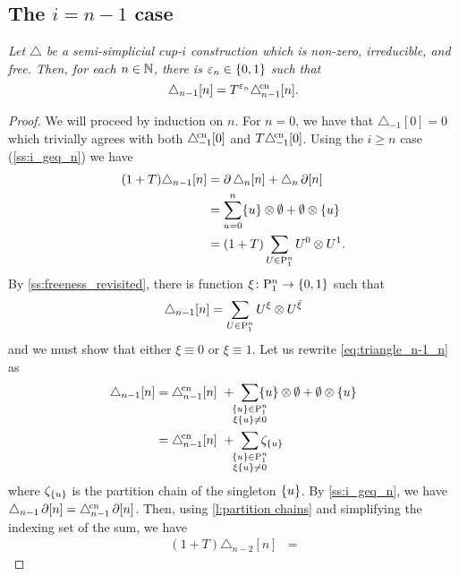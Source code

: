 \subsection{The $i = n-1$ case}\label{ss:i_equals_n_minus_1}

\textit{
	Let $\triangle$ be a semi-simplicial cup-$i$ construction which is non-zero, irreducible, and free.
	Then, for each $n \in \mathbb{N}$, there is $\varepsilon_n \in \{0,1\}$ such that
	\[
	\triangle_{n-1} [n] = T^{\varepsilon_n} \triangle^{\!\mathrm{cn}}_{n-1} [n].
	\]
}

\begin{proof}
	We will proceed by induction on $n$.
	For $n = 0$, we have that $\triangle_{-1}[0] = 0$ which trivially agrees with both $\triangle^{\!\mathrm{cn}}_{-1}[0]$ and $T\triangle^{\!\mathrm{cn}}_{-1}[0]$.
	Using the $i \geq n$ case (\cref{ss:i_geq_n}) we have
	\begin{align*}
		(1+T)\triangle_{n-1}[n] &=
		\operatorname{\partial}\triangle_n[n] + \triangle_n\operatorname{\partial}[n] \\ &=
		\sum_{u=0}^n \{u\} \otimes \emptyset + \emptyset \otimes \{u\} \\ &=
		(1+T)\sum_{U \in \mathrm{P}_1^n} U^0 \otimes U^1.
	\end{align*}
	By \cref{ss:freeness_revisited},  there is function $\xi \colon \mathrm{P}_1^n \to \{0,1\}$ such that
	\begin{equation}\label{eq:triangle_n-1_n}
		\triangle_{n-1}[n] = \sum_{U \in \mathrm{P}_1^n} U^\xi \otimes U^{\bar{\xi}}
	\end{equation}
	and we must show that either $\xi \equiv 0$ or $\xi \equiv 1$.
	Let us rewrite \cref{eq:triangle_n-1_n} as
	\begin{align*}
		\triangle_{n-1}[n] &=
		\canonical_{n-1}[n] \ + \ \sum_{\mathclap{\substack{\set{u} \in \P_1^n \\ \xi \set{u} \neq 0}}} \set{u} \ot \emptyset + \emptyset \ot \set{u} \\ &=
		\canonical_{n-1}[n] \ + \ \sum_{\mathclap{\substack{\set{u} \in \P_1^n \\ \xi \set{u} \neq 0}}} \zeta_{\set{u}}
	\end{align*}
	where $\zeta_{\{u\}}$ is the partition chain of the singleton $\{u\}$.
	By \cref{ss:i_geq_n}, we have $\triangle_{n-1}\operatorname{\partial}[n] = \triangle^{\!\mathrm{cn}}_{n-1}\operatorname{\partial}[n]$.
	Then, using \cref{l:partition chains} and simplifying the indexing set of the sum, we have
	\begin{align*}
		(1+T) \triangle_{n-2}[n] &=

\end{align*}
\end{proof}
